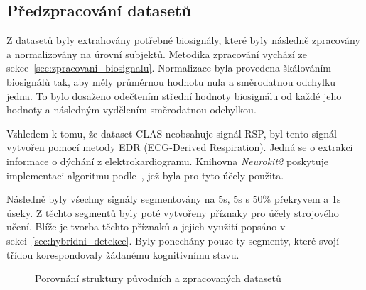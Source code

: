 \subsection{Předzpracování datasetů}
\label{subsec:predzpracovani_datasetu}
Z datasetů byly extrahovány potřebné biosignály, které byly následně zpracovány
a normalizovány na úrovní subjektů. Metodika zpracování vychází ze
sekce~\ref{sec:zpracovani_biosignalu}. Normalizace byla provedena škálováním
biosignálů tak, aby měly průměrnou hodnotu nula a směrodatnou odchylku jedna. To
bylo dosaženo odečtením střední hodnoty biosignálu od každé jeho hodnoty a
následným vydělením směrodatnou odchylkou.

Vzhledem k tomu, že dataset CLAS neobsahuje signál RSP, byl tento signál
vytvořen pomocí metody \gls{EDR} (ECG-Derived Respiration). Jedná se o extrakci
informace o dýchání z elektrokardiogramu. Knihovna \textit{Neurokit2} poskytuje
implementaci algoritmu podle~\cite{VanGent2019}, jež byla pro tyto účely
použita.

Následně byly všechny signály segmentovány na 5s, 5s s 50\% překryvem a 1s
úseky. Z těchto segmentů byly poté vytvořeny příznaky pro účely strojového
učení. Blíže je tvorba těchto příznaků a jejich využití popsáno v
sekci~\ref{sec:hybridni_detekce}. Byly ponechány pouze ty segmenty, které svojí
třídou korespondovaly žádanému kognitivnímu stavu.

\begin{figure}[h]
    \centering
    \caption{Porovnání struktury původních a zpracovaných datasetů}
    \label{fig:struktura_datasetu}
\end{figure}

